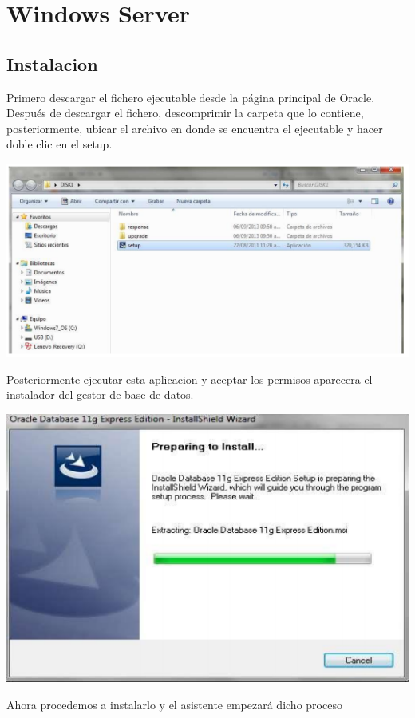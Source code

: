 \documentclass[12pt,letterpaper]{article}
\begin{document}
\section{Windows Server}
\subsection{Instalacion}
Primero descargar el fichero ejecutable desde la página principal de Oracle.
Después de descargar el fichero, descomprimir la carpeta que lo contiene,
posteriormente, ubicar el archivo en donde se encuentra el ejecutable y
hacer doble clic en el setup.
\begin{center}
\includegraphics[width=15cm]{./IMG/img1}
\end{center} 
Posteriormente ejecutar esta aplicacion y aceptar los permisos aparecera el
instalador del gestor de base de datos.
\begin{center}
\includegraphics[width=15cm]{./IMG/img2}
\end{center} 
Ahora procedemos a instalarlo y el asistente empezará dicho proceso
\end{document}
